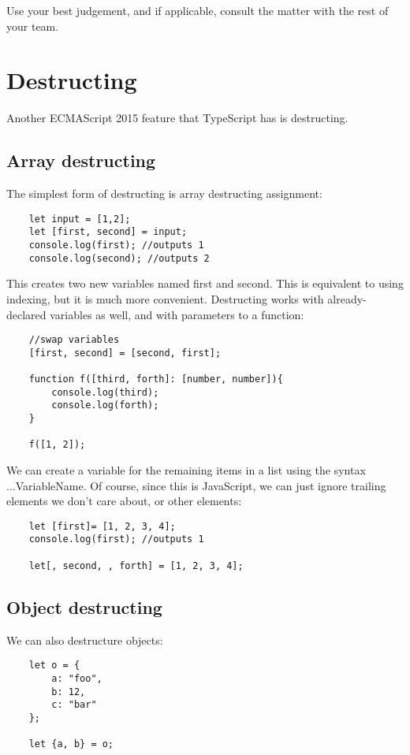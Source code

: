 Use your best judgement, and if applicable, consult the matter with the rest of your team.

\section{Destructing}
Another ECMAScript 2015 feature that TypeScript has is destructing.

\subsection{Array destructing}
The simplest form of destructing is array destructing assignment:

\begin{lstlisting}
    let input = [1,2];
    let [first, second] = input;
    console.log(first); //outputs 1
    console.log(second); //outputs 2
\end{lstlisting}

This creates two new variables named first and second. This is equivalent to using indexing, but it is much more convenient. Destructing works with already-declared variables as well, and with parameters to a function:

\begin{lstlisting}
    //swap variables
    [first, second] = [second, first];

    function f([third, forth]: [number, number]){
        console.log(third);
        console.log(forth);
    }

    f([1, 2]);
\end{lstlisting}

We can create a variable for the remaining items in a list using the syntax ...VariableName. Of course, since this is JavaScript, we can just ignore trailing elements we don't care about, or other elements:
\begin{lstlisting}
    let [first]= [1, 2, 3, 4];
    console.log(first); //outputs 1

    let[, second, , forth] = [1, 2, 3, 4];
\end{lstlisting}

\subsection{Object destructing}
We can also destructure objects:
\begin{lstlisting}
    let o = {
        a: "foo",
        b: 12,
        c: "bar"
    };

    let {a, b} = o;
\end{lstlisting}


